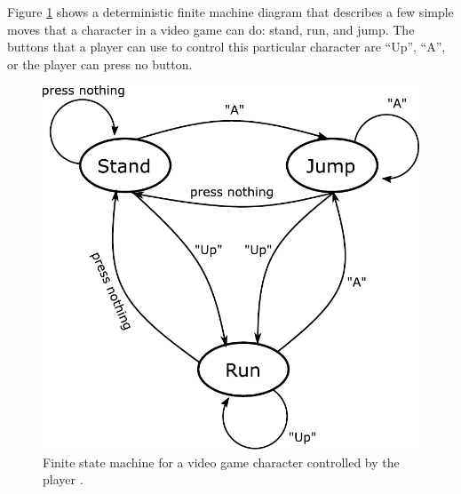     Figure \ref{img:finite} shows a deterministic finite machine diagram that describes a few simple moves that a character in a video game can do: stand, run, and jump. The buttons that a player can use to control this particular character are ``Up'', ``A'', or the player can press no button.
      \begin{figure}[H]
          \centering
          \includegraphics[scale=0.5]{files/Finite.pdf}
          \caption{Finite state machine for a video game character controlled by the player  \cite{brilliantFinite}.}
          \label{img:finite}
      \end{figure}

